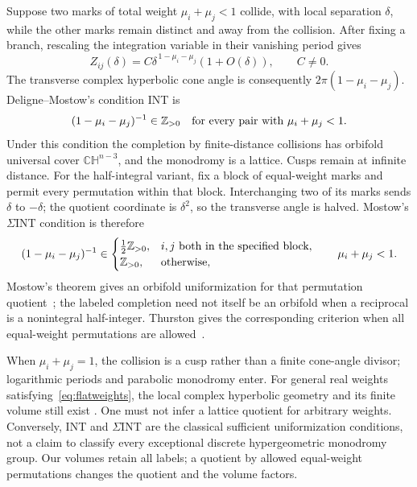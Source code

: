 Suppose two marks of total weight $\mu_i+\mu_j<1$ collide, with local
separation $\delta$, while the other marks remain distinct and away
from the collision. After fixing a branch, rescaling the integration variable in their
vanishing period gives
\begin{equation}
 Z_{ij}(\delta)=C\delta^{\,1-\mu_i-\mu_j}(1+O(\delta)),\qquad C\ne0.
 \label{eq:vanishingperiod}
\end{equation}
The transverse complex hyperbolic cone angle is consequently
$2\pi(1-\mu_i-\mu_j)$. Deligne--Mostow's condition INT is
\begin{equation}
 (1-\mu_i-\mu_j)^{-1}\in\mathbb Z_{>0}
 \quad\text{for every pair with }\mu_i+\mu_j<1.
 \label{eq:INT}
\end{equation}
Under this condition the completion by finite-distance collisions has
orbifold universal cover $\mathbb{CH}^{n-3}$, and the monodromy is a
lattice. Cusps remain at infinite distance. For the half-integral
variant, fix a block of equal-weight marks and permit every permutation
within that block. Interchanging two of its marks sends $\delta$ to
$-\delta$; the quotient coordinate is $\delta^2$, so the transverse
angle is halved.
Mostow's $\Sigma$INT condition is therefore
\[
 (1-\mu_i-\mu_j)^{-1}\in
 \begin{cases}
 \tfrac12\mathbb Z_{>0},&i,j\text{ both in the specified block},\\
 \mathbb Z_{>0},&\text{otherwise},
 \end{cases}
 \qquad \mu_i+\mu_j<1.
\]
Mostow's theorem gives an orbifold uniformization for that permutation
quotient~\cite[Sections 1--3]{MostowHalfIntegral}; the labeled completion
need not itself be an orbifold when a reciprocal is a nonintegral
half-integer. Thurston gives the corresponding criterion when all
equal-weight permutations are allowed~\cite[Theorem 0.2]{ThurstonShapes}.

When $\mu_i+\mu_j=1$, the collision is a cusp rather than a finite
cone-angle divisor; logarithmic periods and parabolic monodromy enter.
For general real weights satisfying~\eqref{eq:flatweights}, the local
complex hyperbolic geometry and its finite volume still exist
\cite[Theorem 0.2]{ThurstonShapes}. One
must not infer a lattice quotient for arbitrary weights. Conversely,
INT and $\Sigma$INT are the classical sufficient uniformization
conditions, not a claim to classify every exceptional discrete
hypergeometric monodromy group. Our volumes retain all labels; a
quotient by allowed equal-weight permutations changes the quotient
and the volume factors.

